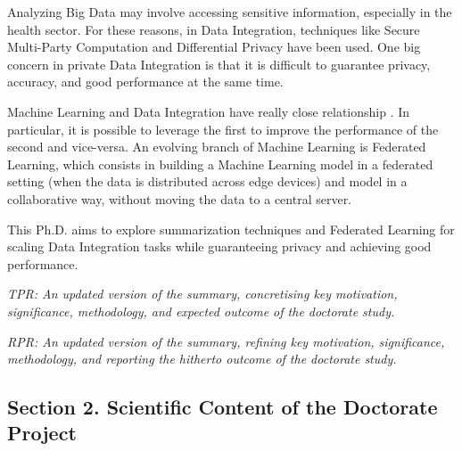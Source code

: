 \documentclass[12pt]{article}
\begin{document}
Analyzing Big Data may involve accessing sensitive information, especially in the health sector. For these reasons, in Data Integration, 
techniques like Secure Multi-Party Computation and Differential Privacy \cite*{Dwork2013} have been used. One big concern in private Data Integration is that it is 
difficult to guarantee privacy, accuracy, and good performance at the same time.

Machine Learning and Data Integration have really close relationship \cite*{Dong2019}. In particular, it is possible to leverage the first to improve the performance of the second
and vice-versa. An evolving branch of Machine Learning is Federated Learning, which consists in building a Machine Learning model in a federated setting (when the data is distributed across
 edge devices) and model in a collaborative way, without moving the data to a central server.

 This Ph.D. aims to explore summarization techniques and Federated Learning for scaling Data Integration tasks while guaranteeing privacy and achieving good performance.



\begin{shaded}
\noindent
\emph{TPR: An updated version of the summary, concretising key motivation, significance, methodology, and expected outcome of the doctorate study.}

\noindent
\emph{RPR: An updated version of the summary, refining key motivation, significance, methodology, and reporting the hitherto outcome of the doctorate study.}
\end{shaded}

\subsection*{Section 2. Scientific Content of the Doctorate Project}
\end{document}

